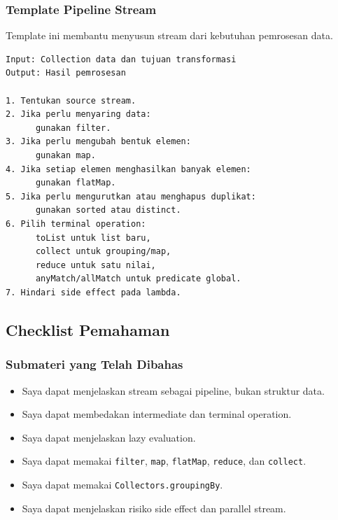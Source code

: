 \subsubsection{Template Pipeline Stream}

\begin{jawab}
Template ini membantu menyusun stream dari kebutuhan pemrosesan data.
\end{jawab}

\begin{lstlisting}[caption={Pseudocode desain pipeline stream}, label={lst:stream-template}]
Input: Collection data dan tujuan transformasi
Output: Hasil pemrosesan

1. Tentukan source stream.
2. Jika perlu menyaring data:
      gunakan filter.
3. Jika perlu mengubah bentuk elemen:
      gunakan map.
4. Jika setiap elemen menghasilkan banyak elemen:
      gunakan flatMap.
5. Jika perlu mengurutkan atau menghapus duplikat:
      gunakan sorted atau distinct.
6. Pilih terminal operation:
      toList untuk list baru,
      collect untuk grouping/map,
      reduce untuk satu nilai,
      anyMatch/allMatch untuk predicate global.
7. Hindari side effect pada lambda.
\end{lstlisting}

\subsection{Checklist Pemahaman}

\subsubsection{Submateri yang Telah Dibahas}

\begin{itemize}
    \item[$\square$] Saya dapat menjelaskan stream sebagai pipeline, bukan struktur data.
    \item[$\square$] Saya dapat membedakan intermediate dan terminal operation.
    \item[$\square$] Saya dapat menjelaskan lazy evaluation.
    \item[$\square$] Saya dapat memakai \texttt{filter}, \texttt{map}, \texttt{flatMap}, \texttt{reduce}, dan \texttt{collect}.
    \item[$\square$] Saya dapat memakai \texttt{Collectors.groupingBy}.
    \item[$\square$] Saya dapat menjelaskan risiko side effect dan parallel stream.
\end{itemize}

